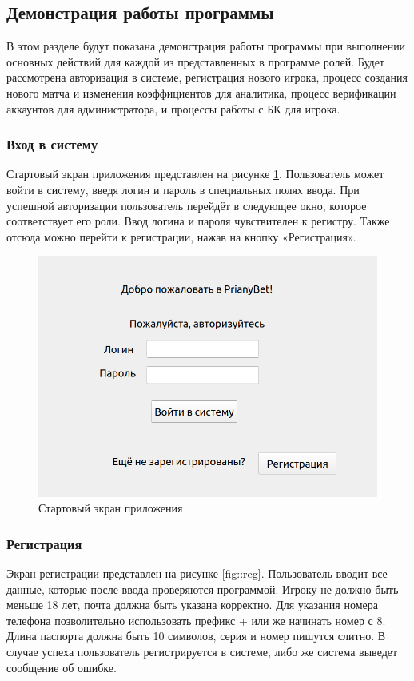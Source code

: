 \newpage
\subsection{Демонстрация работы программы}
В этом разделе будут показана демонстрация работы программы при выполнении основных действий для каждой из представленных в программе ролей. Будет рассмотрена авторизация в системе, регистрация нового игрока, процесс создания нового матча и изменения коэффициентов для аналитика, процесс верификации аккаунтов для администратора, и процессы работы с БК для игрока.

\subsubsection{Вход в систему}
Стартовый экран приложения представлен на рисунке \ref{fig::start}. 
Пользователь может войти в систему, введя логин и пароль в специальных полях ввода.
При успешной авторизации пользователь перейдёт в следующее окно, которое соответствует его роли.
Ввод логина и пароля чувствителен к регистру.
Также отсюда можно перейти к регистрации, нажав на кнопку «Регистрация». 

\FloatBarrier
\begin{figure}[hp]	
	\begin{center}
		\includegraphics[width=\linewidth]{inc/start.png}
	\end{center}
	\captionsetup{justification=centering, labelsep=defffis}
	\caption{Стартовый экран приложения}
	\label{fig::start}
\end{figure}
\FloatBarrier

\newpage
\subsubsection{Регистрация}
Экран регистрации представлен на рисунке \ref{fig::reg}. 
Пользователь вводит все данные, которые после ввода проверяются программой.
Игроку не должно быть меньше 18 лет, почта должна быть указана корректно.
Для указания номера телефона позволительно использовать префикс + или же начинать номер с 8.
Длина паспорта должна быть 10 символов, серия и номер пишутся слитно.
В случае успеха пользователь регистрируется в системе, либо же система выведет сообщение об ошибке.

